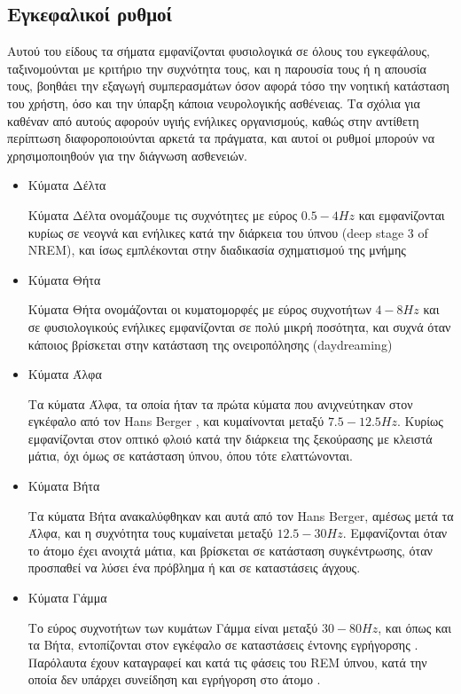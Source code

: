 \documentclass[11pt,a4paper,english,greek,twoside]{../Thesis}
\begin{document}
  \subsection{Εγκεφαλικοί ρυθμοί}
    \par Αυτού του είδους τα σήματα εμφανίζονται φυσιολογικά σε όλους του εγκεφάλους, ταξινομούνται με κριτήριο την συχνότητα τους, και η παρουσία τους ή η απουσία τους, βοηθάει την εξαγωγή συμπερασμάτων όσον αφορά τόσο την νοητική κατάσταση του χρήστη, όσο και την ύπαρξη κάποια νευρολογικής ασθένειας. Τα σχόλια για καθέναν από αυτούς αφορούν υγιής ενήλικες οργανισμούς, καθώς στην αντίθετη περίπτωση διαφοροποιούνται αρκετά τα πράγματα, και αυτοί οι ρυθμοί μπορούν να χρησιμοποιηθούν για την διάγνωση ασθενειών. 
    \begin{itemize}
        \item {Κύματα Δέλτα}
        \par Κύματα Δέλτα ονομάζουμε τις συχνότητες με εύρος $0.5 - 4 Hz$ και εμφανίζονται κυρίως σε νεογνά και ενήλικες κατά την διάρκεια του ύπνου (deep stage 3 of NREM), και ίσως εμπλέκονται στην διαδικασία σχηματισμού της μνήμης \cite{Maquet2001-cs}
        \item {Κύματα Θήτα}
        \par Κύματα Θήτα ονομάζονται οι κυματομορφές με εύρος συχνοτήτων $4 - 8Hz$ και σε φυσιολογικούς ενήλικες εμφανίζονται σε πολύ μικρή ποσότητα, και συχνά όταν κάποιος βρίσκεται στην κατάσταση της ονειροπόλησης (daydreaming)
        \item {Κύματα Άλφα}
        \par Τα κύματα Άλφα, τα οποία ήταν τα πρώτα κύματα που ανιχνεύτηκαν στον εγκέφαλο από τον Hans Berger \cite{Berger1933-pg}, και κυμαίνονται μεταξύ $7.5 - 12.5Hz$. Κυρίως εμφανίζονται στον οπτικό φλοιό κατά την διάρκεια της ξεκούρασης με κλειστά μάτια, όχι όμως σε κατάσταση ύπνου, όπου τότε ελαττώνονται. 
        \item {Κύματα Βήτα}
        \par Τα κύματα Βήτα ανακαλύφθηκαν και αυτά από τον Hans Berger, αμέσως μετά τα Άλφα, και η συχνότητα τους κυμαίνεται μεταξύ $12.5 - 30Hz$. Εμφανίζονται όταν το άτομο έχει ανοιχτά μάτια, και βρίσκεται σε κατάσταση συγκέντρωσης, όταν προσπαθεί να λύσει ένα πρόβλημα ή και σε καταστάσεις άγχους.
        \item{Κύματα Γάμμα}
        \par Το εύρος συχνοτήτων των κυμάτων Γάμμα είναι μεταξύ $30 - 80Hz$, και όπως και τα Βήτα, εντοπίζονται στον εγκέφαλο σε καταστάσεις έντονης εγρήγορσης \cite{Bressler1990-im}. Παρόλαυτα έχουν καταγραφεί και κατά τις φάσεις του REM ύπνου, κατά την οποία δεν υπάρχει συνείδηση και εγρήγορση στο άτομο \cite{Steriade1996-pg}.
    \end{itemize}
\end{document}
